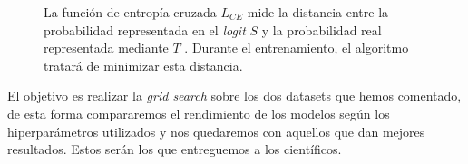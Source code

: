 \begin{figure}[H]
\centering
    \caption{La función de entropía cruzada $L_{CE}$ mide la distancia entre la probabilidad representada en el \textit{logit} $S$ y la probabilidad real representada mediante $T$ \cite{crossentropyloss}. Durante el entrenamiento, el algoritmo tratará de minimizar esta distancia.}
\end{figure}

\newpage
El objetivo es realizar la \textit{grid search} sobre los dos datasets que hemos comentado, de esta forma compararemos el rendimiento de los modelos según los hiperparámetros utilizados y nos quedaremos con aquellos que dan mejores resultados. Estos serán los que entreguemos a los científicos.

